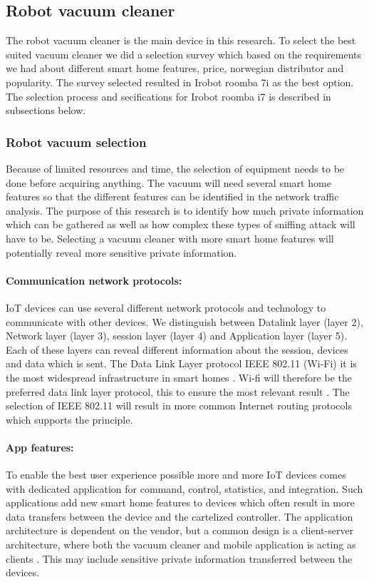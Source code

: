 \subsection{Robot vacuum cleaner}
The robot vacuum cleaner is the main device in this research. To select the best suited vacuum cleaner we did a selection survey which based on the requirements we had about different smart home features, price, norwegian distributor and popularity. The survey selected resulted in Irobot roomba 7i as the best option. The selection process and secifications for Irobot roomba i7 is described in subsections below.

\subsubsection{Robot vacuum selection}
Because of limited resources and time, the selection of equipment needs to be done before acquiring anything. The vacuum will need several smart home features so that the different features can be identified in the network traffic analysis. The purpose of this research is to identify how much private information which can be gathered as well as how complex these types of sniffing attack will have to be. Selecting a vacuum cleaner with more smart home features will potentially reveal more sensitive private information.

    \paragraph{Communication network protocols:} IoT devices can use several different network protocols and technology to communicate with other devices. We distinguish between Datalink layer (layer 2), Network layer (layer 3), session layer (layer 4) and Application layer (layer 5). Each of these layers can reveal different information about the session, devices and data which is sent. The Data Link Layer protocol IEEE 802.11 (Wi-Fi) it is the most widespread infrastructure in smart homes \cite{robotsel1}. Wi-fi will therefore be the preferred data link layer protocol, this to ensure the most relevant result \cite{robotsel2}\cite{robotsel3}. The selection of IEEE 802.11 will result in more common Internet routing protocols which supports the principle.

    \paragraph{App features:} To enable the best user experience possible more and more IoT devices comes with dedicated application for command, control, statistics, and integration. Such applications add new smart home features to devices which often result in more data transfers between the device and the cartelized controller. The application architecture is dependent on the vendor, but a common design is a client-server architecture, where both the vacuum cleaner and mobile application is acting as clients \cite{robotsel4}. This may include sensitive private information transferred between the devices. \cite{robotsel7}

